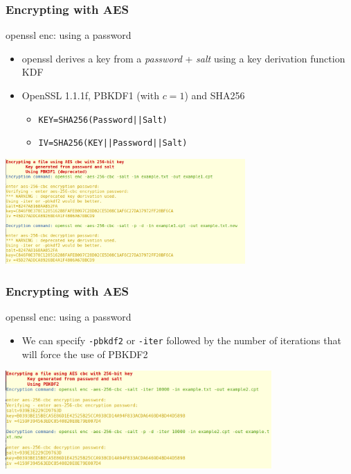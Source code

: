 \documentclass[]{beamer}
\begin{document}
{\begin{frame}
\frametitle{Encrypting with AES}
\begin{block}{openssl enc: using a password}
\begin{itemize}
\item openssl derives a key from a {\em password} + {\em salt} 
using a key derivation function KDF
\item OpenSSL 1.1.1f, PBKDF1 (with $c=1$)  and SHA256
        \begin{itemize}
            \item {\tt KEY=SHA256(Password||Salt)}
            \item {\tt IV=SHA256(KEY||Password||Salt)}
        \end{itemize}
\end{itemize}
\end{block}

\begin{center}
\includegraphics[width=3.6in]{imgs/PBKDF1.png}
\end{center}
\end{frame}

\begin{frame}
\frametitle{Encrypting with AES}
\begin{block}{openssl enc: using a password}
\begin{itemize}
\item We can specify {\tt -pbkdf2} or {\tt -iter} followed by the number
of iterations that will force the use of PBKDF2
\end{itemize}
\end{block}
\begin{center}
\includegraphics[width=4in]{imgs/PBKDF2.png}
\end{center}
\end{frame}

}
\end{document}
